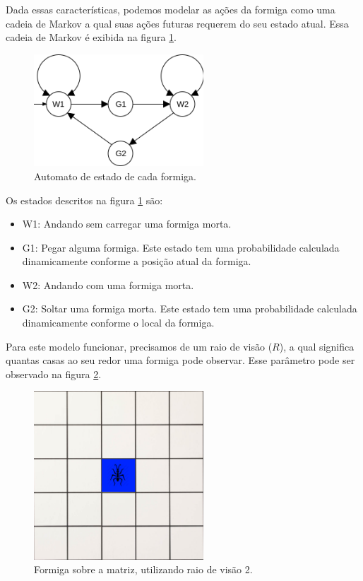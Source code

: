 \documentclass[conference]{IEEEtran}
\begin{document}
Dada essas características, podemos modelar as ações da formiga como uma cadeia de Markov a qual suas ações futuras requerem do seu estado atual. Essa cadeia de Markov é exibida na figura \ref{fig:automata}.

\begin{figure}[ht]
\centering
\includegraphics[width=2.5in]{how_walk_1.png}
\caption{Automato de estado de cada formiga.}
\label{fig:automata}
\end{figure}

Os estados descritos na figura \ref{fig:automata} são:

\begin{itemize}
    \item W1: Andando sem carregar uma formiga morta.
    \item G1: Pegar alguma formiga. Este estado tem uma probabilidade calculada dinamicamente conforme a posição atual da formiga.
    \item W2: Andando com uma formiga morta.
    \item G2: Soltar uma formiga morta. Este estado tem uma probabilidade calculada dinamicamente conforme o local da formiga.
\end{itemize}

Para este modelo funcionar, precisamos de um raio de visão ($R$), a qual significa quantas casas ao seu redor uma formiga pode observar. Esse parâmetro pode ser observado na figura \ref{fig:raio}.

\begin{figure}[h]
\centering
\includegraphics[width=2.5in]{formiga.png}
\caption{Formiga sobre a matriz, utilizando raio de visão 2.}
\label{fig:raio}
\end{figure}
\end{document}
